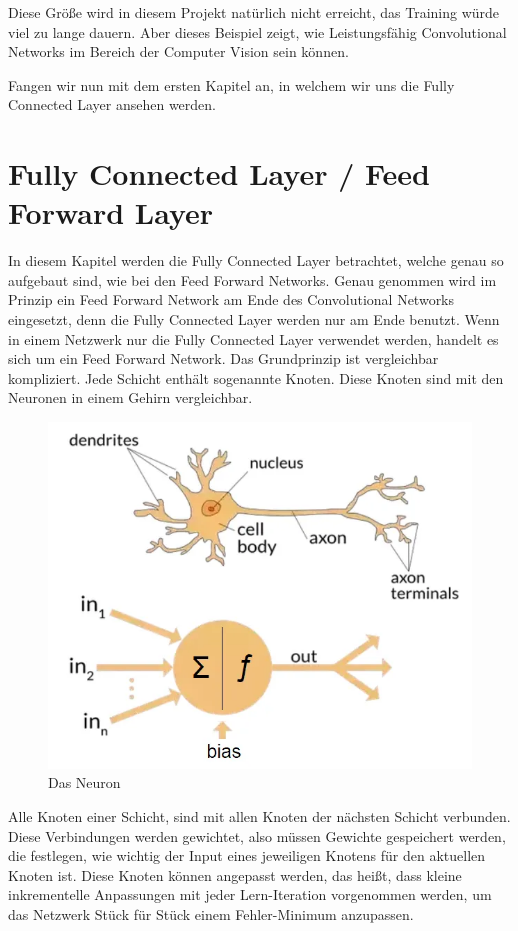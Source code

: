 \documentclass[12pt]{article}
\begin{document}
Diese Größe wird in diesem Projekt natürlich nicht erreicht, das Training würde viel zu lange dauern. Aber dieses Beispiel zeigt, wie Leistungsfähig Convolutional Networks im Bereich der Computer Vision sein können. 

Fangen wir nun mit dem ersten Kapitel an, in welchem wir uns die Fully Connected Layer ansehen werden.

\cleardoublepage
\section{Fully Connected Layer / Feed Forward Layer}
In diesem Kapitel werden die Fully Connected Layer betrachtet, welche genau so aufgebaut sind, wie bei den Feed Forward Networks. Genau genommen wird im Prinzip ein Feed Forward Network am Ende des Convolutional Networks eingesetzt, denn die Fully Connected Layer werden nur am Ende benutzt. Wenn in einem Netzwerk nur die Fully Connected Layer verwendet werden, handelt es sich um ein Feed Forward Network. 
Das Grundprinzip ist vergleichbar kompliziert. Jede Schicht enthält sogenannte Knoten. Diese Knoten sind mit den Neuronen in einem Gehirn vergleichbar.

\begin{figure}[H]
\centering
\includegraphics[scale=0.40]{./Images/001_DasNeuron.png}
\caption{Das Neuron}
\label{Das Neuron}
\end{figure}

Alle Knoten einer Schicht, sind mit allen Knoten der nächsten Schicht verbunden. Diese Verbindungen werden gewichtet, also müssen Gewichte gespeichert werden, die festlegen, wie wichtig der Input eines jeweiligen Knotens für den aktuellen Knoten ist. Diese Knoten können angepasst werden, das heißt, dass kleine inkrementelle Anpassungen mit jeder Lern-Iteration vorgenommen werden, um das Netzwerk Stück für Stück einem Fehler-Minimum anzupassen. 
\end{document}
